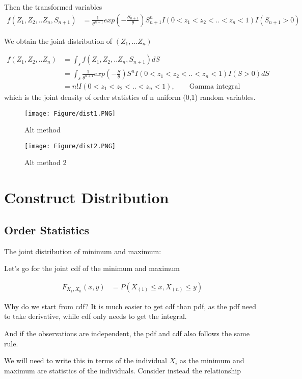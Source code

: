 Then the transformed variables
\begin{align*}
	f(Z_1, Z_2,.. Z_{n}, S_{n+1}) &= \frac{1}{\theta^{n+1}} exp(-\frac{S_{n+1}}{\theta}) S_{n+1}^{n} I(0< z_1 < z_2 <.. <z_n < 1) I(S_{n+1} > 0)
\end{align*}

We obtain the joint distribution of $(Z_1, ... Z_n)$

\begin{align*}
	f(Z_1, Z_2,.. Z_{n}) &= \int_{s} f(Z_1, Z_2,.. Z_{n}, S_{n+1}) dS \\
	&= \int_{s} \frac{1}{\theta^{n+1}} exp(-\frac{S}{\theta}) S^{n} I(0< z_1 < z_2 <.. <z_n < 1) I(S > 0) dS\\
	&= n! I(0< z_1 < z_2 <.. <z_n < 1), \qquad \text{Gamma integral}
\end{align*}
which is the joint density of order statistics of n uniform (0,1) random variables.

\begin{figure}
	\texttt{[image: Figure/dist1.PNG]}  
	\caption{Alt method}
\end{figure}
\begin{figure}
	\texttt{[image: Figure/dist2.PNG]}  
	\caption{Alt method 2}
\end{figure}



\section{Construct Distribution}

\subsection{Order Statistics}
The joint distribution of minimum and maximum:

Let's go for the joint cdf of the minimum and maximum 

\begin{align*}
	F_{X_{1}, X_{n}} (x, y) &= P(X_{(1)} \leq x, X_{(n)} \leq y)  
\end{align*}

Why do we start from cdf? It is much easier to get cdf than pdf, as the pdf need to take derivative, while cdf only needs to get the integral.

And if the observations are independent, the pdf and cdf also follows the same rule. 

We will need to write this in terms of the individual $X_i$ as the minimum and maximum are statistics of the individuals. Consider instead the relationship

